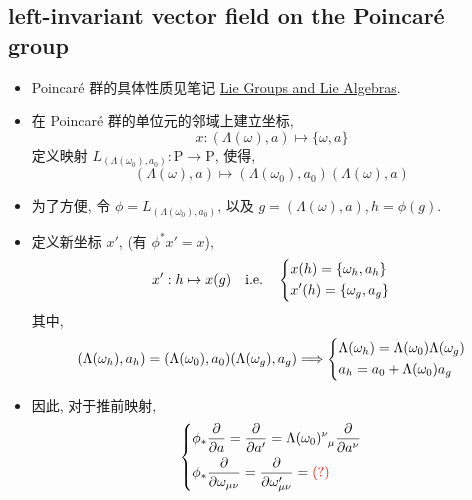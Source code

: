 \documentclass[10pt, a4paper]{article}
\numberwithin{equation}{section}
\begin{document}
	\subsection{left-invariant vector field on the Poincaré group}
	\begin{itemize}
		\item Poincaré 群的具体性质见笔记 \href{https://github.com/siyang03/my-note---Lie-Groups-and-Lie-Algebras}{Lie Groups and Lie Algebras}.
		
		\item 在 Poincaré 群的单位元的邻域上建立坐标,
		\begin{equation}
			x : (\Lambda(\omega), a) \mapsto \{\omega, a\}
		\end{equation}
		定义映射 $L_{(\Lambda(\omega_0), a_0)} : \mathrm{P} \rightarrow \mathrm{P}$, 使得,
		\begin{equation}
			(\Lambda(\omega), a) \mapsto (\Lambda(\omega_0), a_0) (\Lambda(\omega), a)
		\end{equation}
		
		\item 为了方便, 令 $\phi = L_{(\Lambda(\omega_0), a_0)}$, 以及 $g = (\Lambda(\omega), a), h = \phi(g)$.
		
		\item 定义新坐标 $x'$, (有 $\phi^* x' = x$),
		\begin{equation}
			x' : h \mapsto x(g) \quad \text{i.e.} \quad \begin{dcases}
				x(h) = \{\omega_h, a_h\} \\
				x'(h) = \{\omega_g, a_g\}
			\end{dcases}
		\end{equation}
		其中,
		\begin{equation} \label{2.12}
			(\Lambda(\omega_h), a_h) = (\Lambda(\omega_0), a_0) (\Lambda(\omega_g), a_g) \Longrightarrow \begin{dcases}
				\Lambda(\omega_h) = \Lambda(\omega_0) \Lambda(\omega_g) \\
				a_h = a_0 + \Lambda(\omega_0) a_g
			\end{dcases}
		\end{equation}
		
		\item 因此, 对于推前映射,
		\begin{equation}
			\begin{dcases}
				\phi_* \frac{\partial}{\partial a} = \frac{\partial}{\partial a'} = \tensor{\Lambda(\omega_0)}{^\nu_\mu} \frac{\partial}{\partial a^\nu} \\
				\phi_* \frac{\partial}{\partial \omega_{\mu \nu}} = \frac{\partial}{\partial \omega'_{\mu \nu}} = \mathcolor{red}{(?)}
			\end{dcases}
		\end{equation}
		

\end{itemize}
\end{document}

